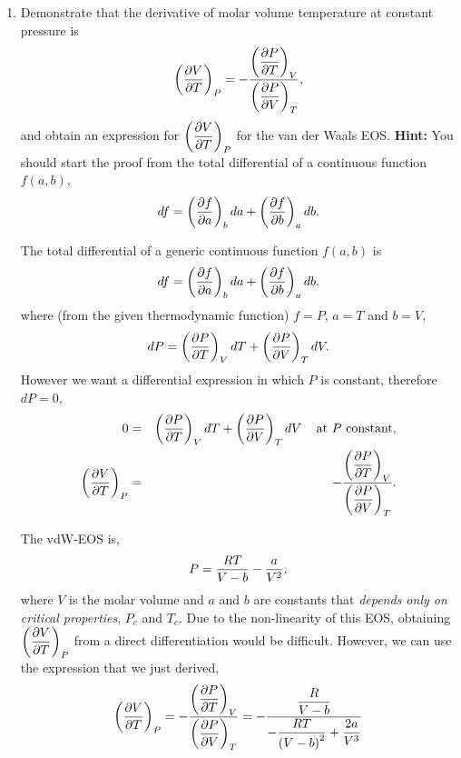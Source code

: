 \begin{enumerate}[1)]
\begin{enumerate}[a)]
%
       \end{enumerate} 

\clearpage
\item\label{Mod03Ex02} Demonstrate that the derivative of molar volume \wrt temperature at constant pressure is
     \begin{displaymath}
         \Partial[V]{T}{P} = -\frc{\Partial[P]{T}{V}}{\Partial[P]{V}{T}},
     \end{displaymath}
     and obtain an expression for $\Partial[V]{T}{P}$ for the van der Waals EOS. {\bf Hint:} You should start the proof from the total differential of a continuous function $f(a,b)$,
     \begin{displaymath}
         df = \Partial[f]{a}{b}da + \Partial[f]{b}{a}db.
     \end{displaymath}

     The total differential of a generic continuous function $f(a,b)$ is
     \begin{displaymath}
         df = \Partial[f]{a}{b}da + \Partial[f]{b}{a}db.
     \end{displaymath}
     where (from the given thermodynamic function) $f=P$, $a=T$ and $b=V$, \ie
     \begin{displaymath}
         dP = \Partial[P]{T}{V}dT + \Partial[P]{V}{T}dV.
     \end{displaymath}
     However we want a differential expression in which $P$ is constant, therefore $dP = 0$,
     \begin{eqnarray}
         0 &=& \Partial[P]{T}{V}dT + \Partial[P]{V}{T}dV \;\;\;\text{ at } P \text{ constant},\nonumber \\
         \Partial[V]{T}{P} &=& -\frc{\Partial[P]{T}{V}}{\Partial[P]{V}{T}}.\nonumber
     \end{eqnarray}

     \medskip\noindent
     The vdW-EOS is,
     \begin{displaymath}
          P = \frc{RT}{V-b} - \frc{a}{V^{2}},
     \end{displaymath}
     where $V$ is the molar volume and $a$ and $b$ are constants that {\it depends only on critical properties}, $P_{c}$ and $T_{c}$. Due to the non-linearity of this EOS, obtaining $\Partial[V]{T}{P}$ from a direct differentiation would be difficult. However, we can use the expression that we just derived,
     \begin{displaymath}
         \Partial[V]{T}{P} = -\frc{\Partial[P]{T}{V}}{\Partial[P]{V}{T}} = -\frc{\frc{R}{V-b}}{-\frc{RT}{\left(V-b\right)^{2}}+\frc{2a}{V^{3}}}
     \end{displaymath} 


\end{enumerate}
